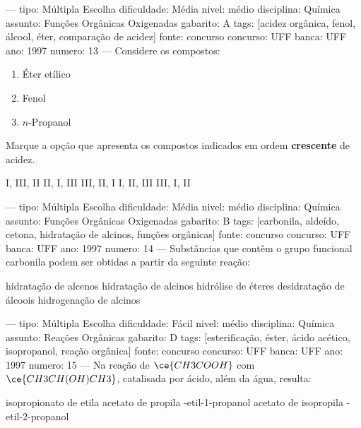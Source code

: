 ---
tipo: Múltipla Escolha
dificuldade: Média
nivel: médio
disciplina: Química
assunto: Funções Orgânicas Oxigenadas
gabarito: A
tags: [acidez orgânica, fenol, álcool, éter, comparação de acidez]
fonte: concurso
concurso: UFF
banca: UFF
ano: 1997
numero: 13
---
\question
Considere os compostos:
\begin{enumerate}
\item Éter etílico
\item Fenol
\item $n$-Propanol
\end{enumerate}
Marque a opção que apresenta os compostos indicados em ordem \textbf{crescente} de acidez.
\begin{choices}
\CorrectChoice I, III, II
\choice II, I, III
\choice III, II, I
\choice I, II, III
\choice III, I, II
\end{choices}

---
tipo: Múltipla Escolha
dificuldade: Média
nivel: médio
disciplina: Química
assunto: Funções Orgânicas Oxigenadas
gabarito: B
tags: [carbonila, aldeído, cetona, hidratação de alcinos, funções orgânicas]
fonte: concurso
concurso: UFF
banca: UFF
ano: 1997
numero: 14
---
\question
Substâncias que contêm o grupo funcional carbonila podem ser obtidas a partir da seguinte reação:
\begin{choices}
\choice hidratação de alcenos
\CorrectChoice hidratação de alcinos
\choice hidrólise de éteres
\choice desidratação de álcoois
\choice hidrogenação de alcinos
\end{choices}

---
tipo: Múltipla Escolha
dificuldade: Fácil
nivel: médio
disciplina: Química
assunto: Reações Orgânicas
gabarito: D
tags: [esterificação, éster, ácido acético, isopropanol, reação orgânica]
fonte: concurso
concurso: UFF
banca: UFF
ano: 1997
numero: 15
---
\question
Na reação de $\ce{CH3COOH}$ com $\ce{CH3CH(OH)CH3}$, catalisada por ácido, além da água, resulta:
\begin{choices}
\choice isopropionato de etila
\choice acetato de propila
-etil-1-propanol
\CorrectChoice acetato de isopropila
-etil-2-propanol
\end{choices}
